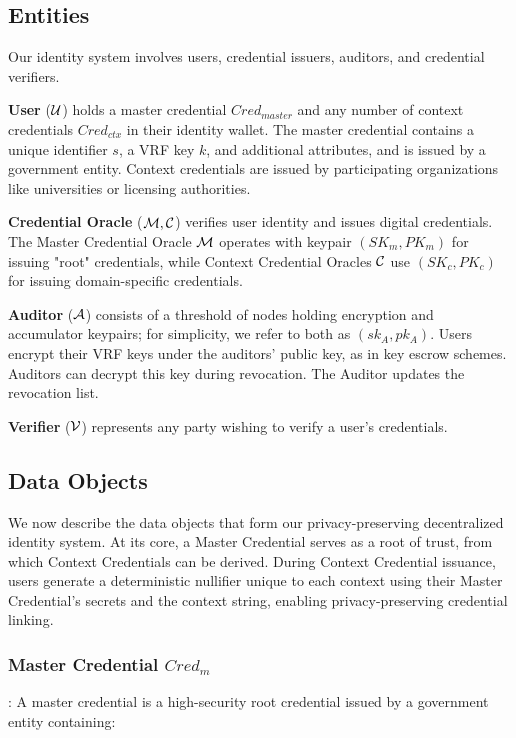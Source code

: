 \subsection{Entities}
Our identity system involves users, credential issuers, auditors, and credential verifiers.

\noindent \textbf{User} ($\mathcal{U}$) holds a master credential $Cred_{master}$ and any number of context credentials $Cred_{ctx}$ in their identity wallet. The master credential contains a unique identifier $s$, a VRF key $k$, and additional attributes, and is issued by a government entity. Context credentials are issued by participating organizations like universities or licensing authorities.

\noindent \textbf{Credential Oracle} ($\mathcal{M}, \mathcal{C}$) verifies user identity and issues digital credentials. The Master Credential Oracle $\mathcal{M}$ operates with keypair $(SK_{m}, PK_{m})$ for issuing "root" credentials, while Context Credential Oracles $\mathcal{C}$ use $(SK_{c}, PK_{c})$ for issuing domain-specific credentials.

\noindent \textbf{Auditor} ($\mathcal{A}$) consists of a threshold of nodes holding encryption and accumulator keypairs; for simplicity, we refer to both as $(sk_A, pk_A)$. Users encrypt their VRF keys under the auditors' public key, as in key escrow schemes. Auditors can decrypt this key during revocation. The Auditor updates the revocation list. 

\noindent \textbf{Verifier} ($\mathcal{V}$) represents any party wishing to verify a user's credentials.

\subsection{Data Objects}

We now describe the data objects that form our privacy-preserving decentralized identity system. At its core, a Master Credential serves as a root of trust, from which Context Credentials can be derived. During Context Credential issuance, users generate a deterministic nullifier unique to each context using their Master Credential's secrets and the context string, enabling privacy-preserving credential linking.

\subsubsection{Master Credential $Cred_m$}: 
A master credential is a high-security root credential issued by a government entity containing:

